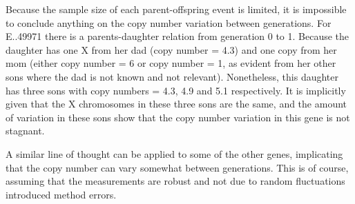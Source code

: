 Because the sample size of each parent-offspring event is limited, it is impossible to conclude anything on the copy number variation between generations. For E..49971 there is a parents-daughter relation from generation 0 to 1. Because the daughter has one X from her dad (copy number = 4.3) and one copy from her mom (either copy number = 6 or copy number = 1, as evident from her other sons where the dad is not known and not relevant). Nonetheless, this daughter has three sons with copy numbers = 4.3, 4.9 and 5.1 respectively. It is implicitly given that the X chromosomes in these three sons are the same, and the amount of variation in these sons show that the copy number variation in this gene is not stagnant.





A similar line of thought can be applied to some of the other genes, implicating that the copy number can vary somewhat between generations. This is of course, assuming that the measurements are robust and not due to random fluctuations introduced method errors.